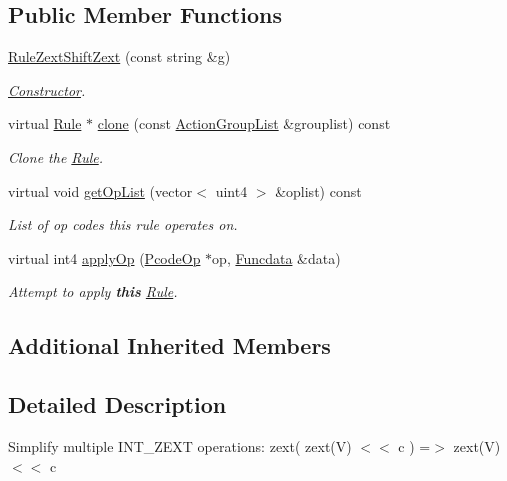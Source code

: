 \subsection*{Public Member Functions}
\begin{DoxyCompactItemize}
\item 
\mbox{\hyperlink{class_rule_zext_shift_zext_aa5c60af258da82264e37438a107c9842}{Rule\+Zext\+Shift\+Zext}} (const string \&g)
\begin{DoxyCompactList}\small\item\em \mbox{\hyperlink{class_constructor}{Constructor}}. \end{DoxyCompactList}\item 
virtual \mbox{\hyperlink{class_rule}{Rule}} $\ast$ \mbox{\hyperlink{class_rule_zext_shift_zext_ab25e32db23f550a5e97561ce7e6c4ca0}{clone}} (const \mbox{\hyperlink{class_action_group_list}{Action\+Group\+List}} \&grouplist) const
\begin{DoxyCompactList}\small\item\em Clone the \mbox{\hyperlink{class_rule}{Rule}}. \end{DoxyCompactList}\item 
virtual void \mbox{\hyperlink{class_rule_zext_shift_zext_aa145662e100fa5a94f300856b4e09a99}{get\+Op\+List}} (vector$<$ uint4 $>$ \&oplist) const
\begin{DoxyCompactList}\small\item\em List of op codes this rule operates on. \end{DoxyCompactList}\item 
virtual int4 \mbox{\hyperlink{class_rule_zext_shift_zext_af3714cc3a4c7d45605a720c076802f98}{apply\+Op}} (\mbox{\hyperlink{class_pcode_op}{Pcode\+Op}} $\ast$op, \mbox{\hyperlink{class_funcdata}{Funcdata}} \&data)
\begin{DoxyCompactList}\small\item\em Attempt to apply {\bfseries{this}} \mbox{\hyperlink{class_rule}{Rule}}. \end{DoxyCompactList}\end{DoxyCompactItemize}
\subsection*{Additional Inherited Members}


\subsection{Detailed Description}
Simplify multiple I\+N\+T\+\_\+\+Z\+E\+XT operations\+: {\ttfamily zext( zext(\+V) $<$$<$ c ) =$>$ zext(\+V) $<$$<$ c} 

